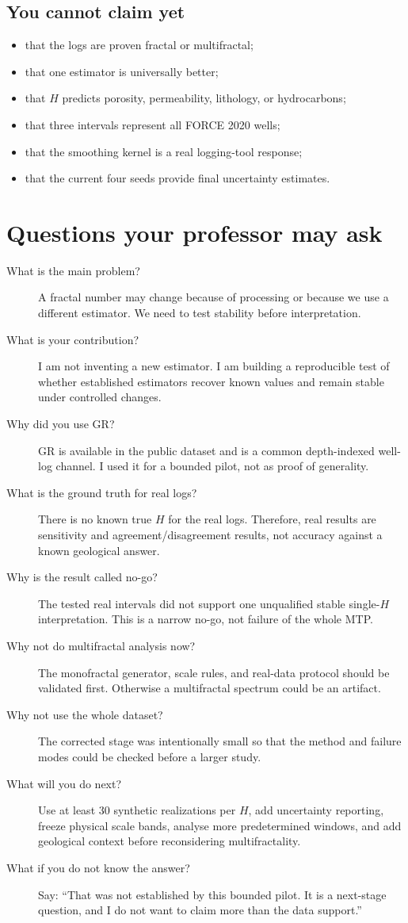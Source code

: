 \documentclass[11pt,a4paper]{article}
\begin{document}
\subsection{You cannot claim yet}
\begin{itemize}
\item that the logs are proven fractal or multifractal;
\item that one estimator is universally better;
\item that $H$ predicts porosity, permeability, lithology, or hydrocarbons;
\item that three intervals represent all FORCE 2020 wells;
\item that the smoothing kernel is a real logging-tool response;
\item that the current four seeds provide final uncertainty estimates.
\end{itemize}

\section{Questions your professor may ask}
\begin{description}
\item[What is the main problem?] A fractal number may change because of processing or because we use a different estimator. We need to test stability before interpretation.
\item[What is your contribution?] I am not inventing a new estimator. I am building a reproducible test of whether established estimators recover known values and remain stable under controlled changes.
\item[Why did you use GR?] GR is available in the public dataset and is a common depth-indexed well-log channel. I used it for a bounded pilot, not as proof of generality.
\item[What is the ground truth for real logs?] There is no known true $H$ for the real logs. Therefore, real results are sensitivity and agreement/disagreement results, not accuracy against a known geological answer.
\item[Why is the result called no-go?] The tested real intervals did not support one unqualified stable single-$H$ interpretation. This is a narrow no-go, not failure of the whole MTP.
\item[Why not do multifractal analysis now?] The monofractal generator, scale rules, and real-data protocol should be validated first. Otherwise a multifractal spectrum could be an artifact.
\item[Why not use the whole dataset?] The corrected stage was intentionally small so that the method and failure modes could be checked before a larger study.
\item[What will you do next?] Use at least 30 synthetic realizations per $H$, add uncertainty reporting, freeze physical scale bands, analyse more predetermined windows, and add geological context before reconsidering multifractality.
\item[What if you do not know the answer?] Say: “That was not established by this bounded pilot. It is a next-stage question, and I do not want to claim more than the data support.”
\end{description}
\end{document}
